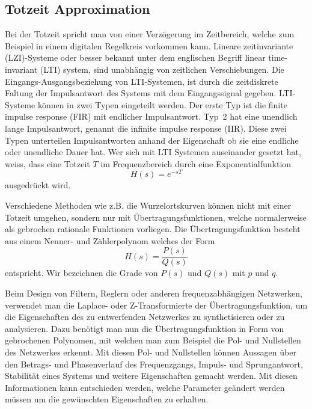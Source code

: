 \subsection{Totzeit Approximation
\label{pade:subsection:totzeit}}
%
%
%
%
%
Bei der Totzeit spricht man von einer Verzögerung im Zeitbereich, welche zum Beispiel in einem digitalen Regelkreis vorkommen kann.
Lineare zeitinvariante (LZI)-Systeme oder besser bekannt unter dem englischen Begriff linear time-invariant (LTI) system, sind unabhängig von zeitlichen Verschiebungen. 
%
%
%
Die Eingangs-Ausgangsbeziehung von LTI-Systemen, ist durch die
zeitdiskrete Faltung der Impulsantwort des Systems mit dem
Eingangssignal gegeben.
LTI-Systeme können in zwei Typen  eingeteilt werden.
Der erste Typ ist die finite impulse response (FIR) mit endlicher Impulsantwort.
%
%
%
%
Typ~2 hat eine unendlich lange Impulsantwort, genannt die infinite impulse response (IIR).
%
%
%
%
Diese zwei Typen unterteilen Impulsantworten anhand der Eigenschaft ob sie eine endliche oder unendliche Dauer hat. 
Wer sich mit LTI Systemen auseinander gesetzt hat, weiss, dass eine Totzeit $T$ im Frequenzbereich durch eine Exponentialfunktion
\begin{equation*}
H(s) = e^{-sT}
\end{equation*}
ausgedrückt wird.

Verschiedene Methoden wie z.B. die Wurzelortskurven können nicht mit einer Totzeit umgehen, sondern nur mit Übertragungsfunktionen, welche normalerweise als gebrochen rationale Funktionen vorliegen.
Die Übertragungsfunktion besteht aus einem Nenner- und Zählerpolynom
welches der Form
\begin{equation*}
H(s)=\frac{P(s)}{Q(s)}
\end{equation*}
entspricht.
Wir bezeichnen die Grade von $P(s)$ und $Q(s)$ mit $p$ und $q$.

Beim Design von Filtern, Reglern oder anderen frequenzabhängigen Netzwerken, verwendet man die Laplace- oder Z-Transformierte der Übertragungsfunktion, um die Eigenschaften des zu entwerfenden Netzwerkes zu synthetisieren oder zu analysieren.
%
%
Dazu benötigt man nun die Übertragungsfunktion in Form von gebrochenen
Polynomen, mit welchen man zum Beispiel die Pol- und Nullstellen
des Netzwerkes erkennt.
Mit diesen Pol- und Nullstellen können Aussagen über den Betrags-
und Phasenverlauf des Frequenzgangs, Impuls- und Sprungantwort,
Stabilität eines Systems und weitere Eigenschaften gemacht werden.
%
%
%
%
%
Mit diesen Informationen kann entschieden werden, welche Parameter geändert werden müssen um die gewünschten Eigenschaften zu erhalten.
 
